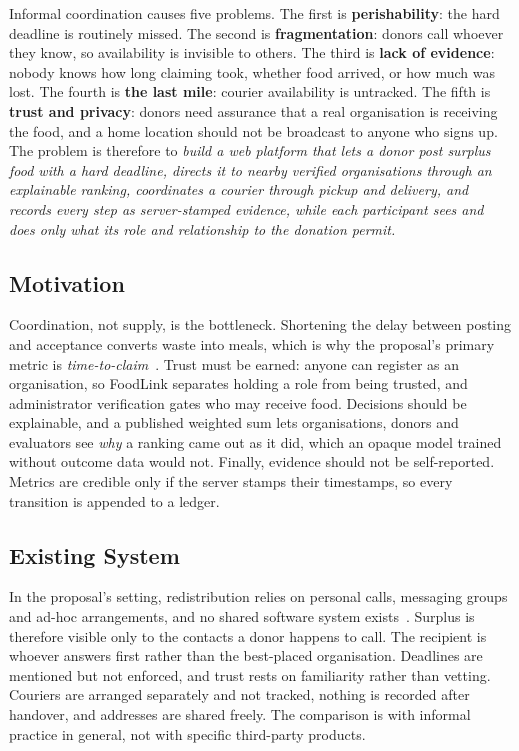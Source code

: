 Informal coordination causes five problems. The first is
\textbf{perishability}: the hard deadline is routinely missed. The second is
\textbf{fragmentation}: donors call whoever they know, so availability is
invisible to others. The third is \textbf{lack of evidence}: nobody knows how
long claiming took, whether food arrived, or how much was lost. The fourth is
\textbf{the last mile}: courier availability is untracked. The fifth is
\textbf{trust and privacy}: donors need assurance that a real organisation is
receiving the food, and a home location should not be broadcast to anyone who
signs up. The problem is therefore to \emph{build a web platform that lets a
donor post surplus food with a hard deadline, directs it to nearby verified
organisations through an explainable ranking, coordinates a courier through
pickup and delivery, and records every step as server-stamped evidence, while
each participant sees and does only what its role and relationship to the
donation permit.}

\subsection{Motivation}
\label{sec:motivation}

Coordination, not supply, is the bottleneck. Shortening the delay between
posting and acceptance converts waste into meals, which is why the proposal's
primary metric is \emph{time-to-claim}~\cite{foodlinkProposal}. Trust must be
earned: anyone can register as an organisation, so FoodLink separates holding a
role from being trusted, and administrator verification gates who may receive
food. Decisions should be explainable, and a published weighted sum lets
organisations, donors and evaluators see \emph{why} a ranking came out as it
did, which an opaque model trained without outcome data would not. Finally,
evidence should not be self-reported. Metrics are credible only if the server
stamps their timestamps, so every transition is appended to a ledger.

\subsection{Existing System}
\label{sec:existing}

In the proposal's setting, redistribution relies on personal calls, messaging
groups and ad-hoc arrangements, and no shared software system
exists~\cite{foodlinkProposal}. Surplus is therefore visible only to the
contacts a donor happens to call. The recipient is whoever answers first rather
than the best-placed organisation. Deadlines are mentioned but not enforced,
and trust rests on familiarity rather than vetting. Couriers are arranged
separately and not tracked, nothing is recorded after handover, and addresses
are shared freely. The comparison is with informal practice in general, not
with specific third-party products.

